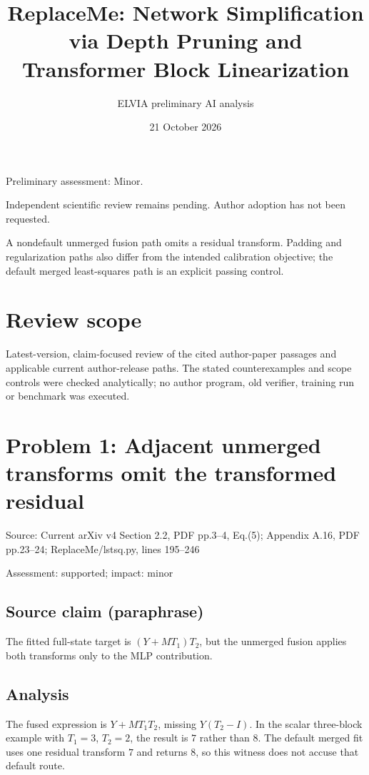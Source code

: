\documentclass[11pt]{article}
\begin{document}
\title{ReplaceMe: Network Simplification via Depth Pruning and Transformer Block Linearization}

\author{ELVIA preliminary AI analysis}\date{21 October 2026}\maketitle

Preliminary assessment: Minor.\par

Independent scientific review remains pending. Author adoption has not been requested.

A nondefault unmerged fusion path omits a residual transform. Padding and regularization paths also differ from the intended calibration objective; the default merged least-squares path is an explicit passing control.

\section*{Review scope}

Latest-version, claim-focused review of the cited author-paper passages and applicable current author-release paths. The stated counterexamples and scope controls were checked analytically; no author program, old verifier, training run or benchmark was executed.

\section*{Problem 1: Adjacent unmerged transforms omit the transformed residual}

Source: Current arXiv v4 Section 2.2, PDF pp.3–4, Eq.(5); Appendix A.16, PDF pp.23–24; ReplaceMe/lstsq.py, lines 195–246

Assessment: supported; impact: minor

\subsection*{Source claim (paraphrase)}

The fitted full-state target is \((Y+MT_1)T_2\), but the unmerged fusion applies both transforms only to the MLP contribution.

\subsection*{Analysis}

The fused expression is \(Y+MT_1T_2\), missing \(Y(T_2-I)\). In the scalar three-block example with \(T_1=3\), \(T_2=2\), the result is \(7\) rather than \(8\). The default merged fit uses one residual transform \(7\) and returns \(8\), so this witness does not accuse that default route.
\end{document}
